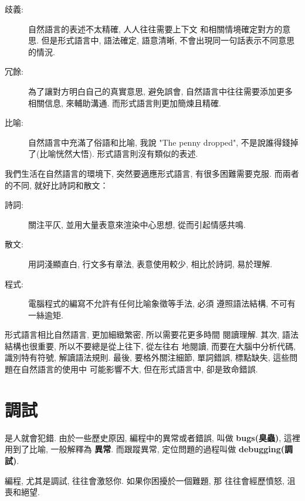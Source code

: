 \documentclass[10pt]{book}
\begin{document}
\begin{description}

\item[歧義:] 自然語言的表述不太精確, 人人往往需要上下文
和相關情境確定對方的意思. 但是形式語言中, 語法確定, 語意清晰, 
不會出現同一句話表示不同意思的情況. 

\item[冗餘:] 為了讓對方明白自己的真實意思, 避免誤會, 
自然語言中往往需要添加更多相關信息, 來輔助溝通. 
而形式語言則更加簡煉且精確. 

\item[比喻:] 自然語言中充滿了俗語和比喻, 我說 "The penny dropped", 
不是說誰得錢掉了(比喻恍然大悟). 形式語言則沒有類似的表述. 

\end{description}

我們生活在自然語言的環境下, 突然要適應形式語言, 有很多困難需要克服. 
而兩者的不同, 就好比詩詞和散文：  

\begin{description}

\item[詩詞:] 關注平仄, 並用大量表意來渲染中心思想, 從而引起情感共鳴. 

\item[散文:] 用詞淺顯直白, 行文多有章法, 表意使用較少, 相比於詩詞, 易於理解. 

\item[程式:] 電腦程式的編寫不允許有任何比喻象徵等手法, 必須
遵照語法結構, 不可有一絲逾矩. 


\end{description}

形式語言相比自然語言, 更加細緻繁密, 所以需要花更多時間
閱讀理解. 其次, 語法結構也很重要, 所以不要總是從上往下, 從左往右
地閱讀, 而要在大腦中分析代碼, 識別特有符號, 解讀語法規則. 
最後, 要格外關注細節, 單詞錯誤, 標點缺失, 這些問題在自然語言的使用中
可能影響不大, 但在形式語言中, 卻是致命錯誤. 

\section{調試}

是人就會犯錯. 由於一些歷史原因, 編程中的異常或者錯誤, 叫做 {\bf bugs(臭蟲)}, 
這裡用到了比喻, 一般解釋為 {\bf 異常}. 
而跟蹤異常, 定位問題的過程叫做 {\bf debugging(調試)}. 

編程, 尤其是調試, 往往會激怒你. 如果你困擾於一個難題, 那
往往會經歷憤怒, 沮喪和絕望. 
\end{document}
